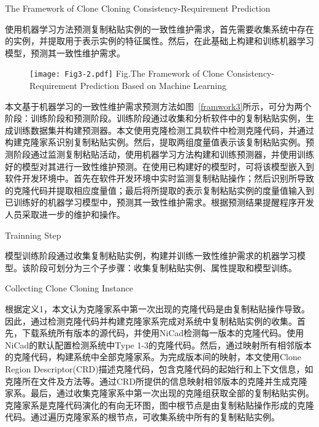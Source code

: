 {The Framework of Clone Cloning Consistency-Requirement Prediction }

使用机器学习方法预测复制粘贴实例的一致性维护需求，首先需要收集系统中存在的实例，并提取用于表示实例的特征属性。然后，在此基础上构建和训练机器学习模型，预测其一致性维护需求。

\begin{figure}[htbp]
\centering
\texttt{[image: Fig3-2.pdf]}
{Fig.$\!$}{The Framework of Clone Consistency-Requirement Prediction Based on Machine Learning}
\vspace{-1em}
\end{figure}

本文基于机器学习的一致性维护需求预测方法如图~\ref{framwork3}所示，可分为两个阶段：训练阶段和预测阶段。训练阶段通过收集和分析软件中的复制粘贴实例，生成训练数据集并构建预测器。本文使用克隆检测工具软件中检测克隆代码，并通过构建克隆家系识别复制粘贴实例。然后，提取两组度量值表示该复制粘贴实例。预测阶段通过监测复制粘贴活动，使用机器学习方法构建和训练预测器，并使用训练好的模型对其进行一致性维护预测。在使用已构建好的模型时，可将该模型嵌入到软件开发环境中。首先在软件开发环境中实时监测复制粘贴操作；然后识别所导致的克隆代码并提取相应度量值；最后将所提取的表示复制粘贴实例的度量值输入到已训练好的机器学习模型中，预测其一致性维护需求。根据预测结果提醒程序开发人员采取进一步的维护和操作。

{Trainning Step}

模型训练阶段通过收集复制粘贴实例，构建并训练一致性维护需求的机器学习模型。该阶段可划分为三个子步骤：收集复制粘贴实例、属性提取和模型训练。

{Collecting Clone Cloning Instance}

根据定义1，本文认为克隆家系中第一次出现的克隆代码是由复制粘贴操作导致。因此，通过检测克隆代码并构建克隆家系完成对系统中复制粘贴实例的收集。首先，下载系统所有版本的源代码，并使用NiCad检测每一版本的克隆代码。使用NiCad的默认配置检测系统中Type 1-3的克隆代码。然后，通过映射所有相邻版本的克隆代码，构建系统中全部克隆家系。为完成版本间的映射，本文使用Clone Region Descriptor(CRD)\cite{duala2010clone}描述克隆代码，包含克隆代码的起始行和上下文信息，如克隆所在文件及方法等。通过CRD所提供的信息映射相邻版本的克隆并生成克隆家系\cite{ci2013new}。最后，通过收集克隆家系中第一次出现的克隆组获取全部的复制粘贴实例。克隆家系是克隆代码演化的有向无环图，图中根节点是由复制粘贴操作形成的克隆代码。通过遍历克隆家系的根节点，可收集系统中所有的复制粘贴实例。

